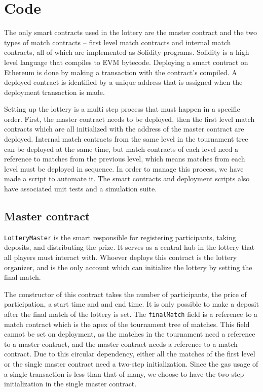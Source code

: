 \section{Code}
\label{sec:code}

The only smart contracts used in the lottery are the master contract and the two types of match contracts – first level match contracts and internal match contracts, all of which are implemented as Solidity programs. Solidity is a high level language that compiles to EVM bytecode. Deploying a smart contract on Ethereum is done by making a transaction with the contract's compiled. A deployed contract is identified by a unique address that is assigned when the deployment transaction is made.

Setting up the lottery is a multi step process that must happen in a specific order. First, the master contract needs to be deployed, then the first level match contracts which are all initialized with the address of the master contract are deployed. Internal match contracts from the same level in the tournament tree can be deployed at the same time, but match contracts of each level need a reference to matches from the previous level, which means matches from each level must be deployed in sequence. In order to manage this process, we have made a script to automate it. The smart contracts and deployment scripts also have associated unit tests and a simulation suite.

\subsection{Master contract}
\texttt{LotteryMaster} is the smart responsible for registering participants, taking deposits, and distributing the prize. It serves as a central hub in the lottery that all players must interact with. Whoever deploys this contract is the lottery organizer, and is the only account which can initialize the lottery by setting the final match. 

The constructor of this contract takes the number of participants, the price of participation, a start time and and end time. It is only possible to make a deposit after the final match of the lottery is set. The \texttt{finalMatch} field is a reference to a match contract which is the apex of the tournament tree of matches. This field cannot be set on deployment, as the matches in the tournament need a reference to a master contract, and the master contract needs a reference to a match contract. Due to this circular dependency, either all the matches of the first level or the single master contract need a two-step initialization. Since the gas usage of a single transaction is less than that of many, we choose to have the two-step initialization in the single master contract.

